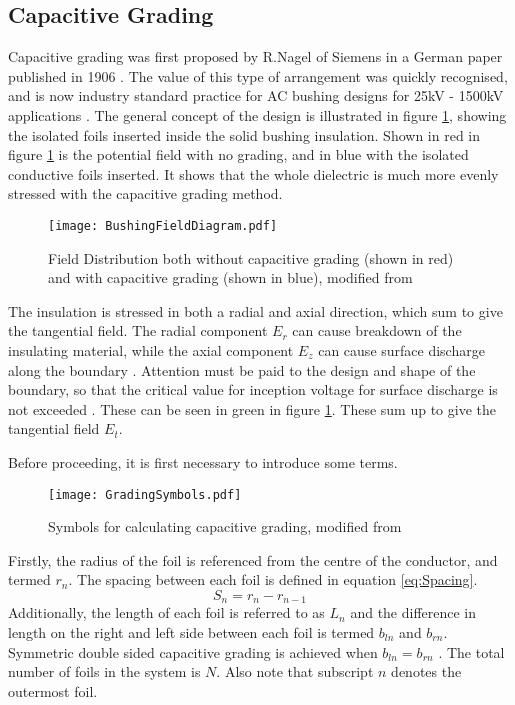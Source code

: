 \subsection{Capacitive Grading} \label{ss:CapacitiveGrading}
Capacitive grading was first proposed by R.Nagel of Siemens in a German paper published in 1906 \cite{harlow2004electric}.
The value of this type of arrangement was quickly recognised, and is now industry standard practice for AC bushing designs for 25kV - 1500kV applications \cite{james2008condition}.
The general concept of the design is illustrated in figure \ref{figure:fieldgeneric}, showing the isolated foils inserted inside the solid bushing insulation.
Shown in red in figure \ref{figure:fieldgeneric} is the potential field with no grading, and in blue with the isolated conductive foils inserted.
It shows that the whole dielectric is much more evenly stressed with the capacitive grading method.
\begin{figure}[!h]
   \centering
   \texttt{[image: BushingFieldDiagram.pdf]}
   \caption{Field Distribution both without capacitive grading (shown in red) and with capacitive grading (shown in blue), modified from \cite{james2008condition}}
   \label{figure:fieldgeneric}
\end{figure}

The insulation is stressed in both a radial and axial direction, which sum to give the tangential field.
The radial component $E_r$ can cause breakdown of the insulating material, while the axial component $E_z$ can cause surface discharge along the boundary \cite{Ahmed11}.
Attention must be paid to the design and shape of the boundary, so that the critical value for inception voltage for surface discharge is not exceeded \cite{david2}.
These can be seen in green in figure \ref{figure:fieldgeneric}.
These sum up to give the tangential field $E_t$.

Before proceeding, it is first necessary to introduce some terms.
\begin{figure}[!h]
   \centering
   \texttt{[image: GradingSymbols.pdf]}
   \caption{Symbols for calculating capacitive grading, modified from \cite{Ahmed11}}
   \label{figure:terms}
\end{figure}
Firstly, the radius of the foil is referenced from the centre of the conductor, and termed $r_n$. 
The spacing between each foil is defined in equation \ref{eq:Spacing}.
\begin{equation}
   \label{eq:Spacing}
   S_n = r_n - r_{n-1}
\end{equation}
Additionally, the length of each foil is referred to as $L_n$ and the difference in length on the right and left side between each foil is termed $b_{ln}$ and $b_{rn}$. 
Symmetric double sided capacitive grading is achieved when $b_{ln}=b_{rn}$ \cite{Ahmed11}. 
The total number of foils in the system is $N$.
Also note that subscript $n$ denotes the outermost foil.

